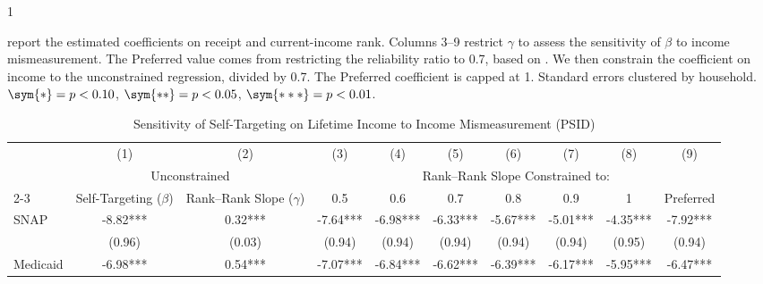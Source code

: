 \begin{table}[]
\begin{spacing}{1}
\begin{tablenotes}
  report the estimated coefficients on receipt and current-income
  rank. Columns 3--9
  restrict $\gamma$ to assess the
  sensitivity of $\beta$ to income mismeasurement. The Preferred value
  comes from restricting the reliability ratio to 0.7, based on \citet{abowd2013estimating}. We then
  constrain the coefficient on income to the unconstrained regression,
  divided by 0.7. The Preferred coefficient is capped at 1. Standard errors clustered by
  household. $\sym{*}=p<0.10$, $\sym{**}=p<0.05$, $\sym{***}=p<0.01$. 
\end{tablenotes}
\end{spacing}
\end{table}

\begin{table}[]     \footnotesize     \centering
\caption{Sensitivity of Self-Targeting on Lifetime Income to Income Mismeasurement (PSID)}
\label{tab:constrained_reg_li}
\begin{tabular*}{1.36\textwidth}{@{\extracolsep{\fill}}lccccccccc}
\toprule
                   & (1)                               & (2)                               & (3)                             & (4)                             & (5)                             & (6)                             & (7)                             & (8)                             & (9) \\
                   & \multicolumn{2}{c}{Unconstrained} & \multicolumn{7}{c}{Rank--Rank Slope Constrained to:} \\
\cmidrule{2-3}\cmidrule{4-10}
                   & Self-Targeting ($\beta$)          & Rank--Rank Slope ($\gamma$)       & 0.5                             & 0.6                             & 0.7                             & 0.8                             & 0.9                             & 1                               & Preferred \\
\midrule
\addlinespace
SNAP               & -8.82***        & 0.32***        & -7.64***        & -6.98***        & -6.33***        & -5.67***        & -5.01***        & -4.35***        & -7.92*** \\
                   & (0.96)            & (0.03)            & (0.94)            & (0.94)            & (0.94)            & (0.94)            & (0.94)            & (0.95)            & (0.94)     \\
\addlinespace
Medicaid           & -6.98***    & 0.54***    & -7.07***    & -6.84***    & -6.62***    & -6.39***    & -6.17***    & -5.95***    & -6.47*** \\

\end{tabular*}
\end{table}
